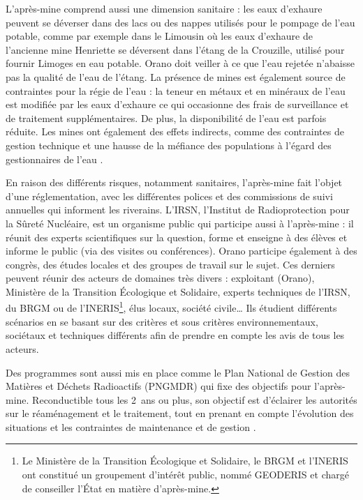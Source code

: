 \documentclass{article}
\begin{document}
L’après-mine comprend aussi une dimension sanitaire : les eaux d’exhaure peuvent se déverser dans des lacs ou des nappes utilisés pour le pompage de l’eau potable, comme par exemple dans le Limousin où les eaux d'exhaure de l'ancienne mine Henriette se déversent dans l'étang de la Crouzille, utilisé pour fournir Limoges en eau potable. Orano doit veiller à ce que l'eau rejetée n'abaisse pas la qualité de l'eau de l'étang. La présence de mines est également source de contraintes pour la régie de l’eau : la teneur en métaux et en minéraux de l’eau est modifiée par les eaux d’exhaure ce qui occasionne des frais de surveillance et de traitement supplémentaires. De plus, la disponibilité de l’eau est parfois réduite. Les mines ont également des effets indirects, comme des contraintes de gestion technique et une hausse de la méfiance des populations à l’égard des gestionnaires de l’eau \cite{vialleseche_station_2020}.

En raison des différents risques, notamment sanitaires, l’après-mine fait l’objet d’une réglementation, avec les différentes polices et des commissions de suivi annuelles qui informent les riverains.
L’IRSN, l’Institut de Radioprotection pour la Sûreté Nucléaire, est un organisme public qui participe aussi à l’après-mine : il réunit des experts scientifiques sur la question, forme et enseigne à des élèves et informe le public (via des visites ou conférences). Orano participe également à des congrès, des études locales et des groupes de travail sur le sujet. Ces derniers peuvent réunir des acteurs de domaines très divers : exploitant (Orano), Ministère de la Transition Écologique et Solidaire, experts techniques de l’IRSN, du BRGM ou de l'INERIS\footnote{Le Ministère de la Transition Écologique et Solidaire, le BRGM et l'INERIS ont constitué un groupement d'intérêt public, nommé GEODERIS et chargé de conseiller l'État en matière d'après-mine.}, élus locaux, société civile… Ils étudient différents scénarios en se basant sur des critères et sous critères environnementaux, sociétaux et techniques différents afin de prendre en compte les avis de tous les acteurs.

Des programmes sont aussi mis en place comme le Plan National de Gestion des Matières et Déchets Radioactifs (PNGMDR) qui fixe des objectifs pour l’après-mine. Reconductible tous les 2~ans ou plus, son objectif est d’éclairer les autorités sur le réaménagement et le traitement, tout en prenant en compte l’évolution des situations et les contraintes de maintenance et de gestion \cite{dublineau_gestion_2020}.
\end{document}
